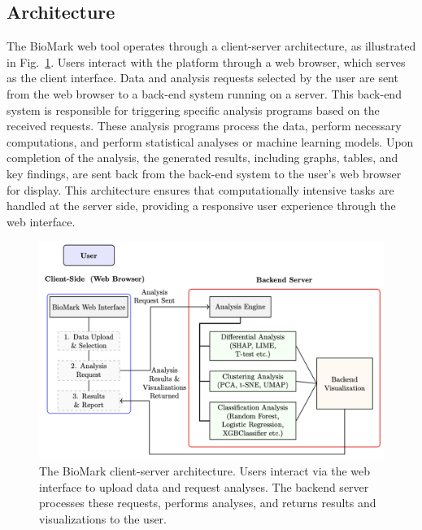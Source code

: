 \documentclass[journal]{IEEEtran}
\begin{document}
\subsection{Architecture}
The BioMark web tool operates through a client-server architecture, as illustrated in Fig.~\ref{fig:architecture}. Users interact with the platform through a web browser, which serves as the client interface. Data and analysis requests selected by the user are sent from the web browser to a back-end system running on a server. This back-end system is responsible for triggering specific analysis programs based on the received requests. These analysis programs process the data, perform necessary computations, and perform statistical analyses or machine learning models. Upon completion of the analysis, the generated results, including graphs, tables, and key findings, are sent back from the back-end system to the user's web browser for display. This architecture ensures that computationally intensive tasks are handled at the server side, providing a responsive user experience through the web interface.

\begin{figure}[htbp]
\centering
\includegraphics[width=\columnwidth]{architecture_diagram.png}
\caption{The BioMark client-server architecture. Users interact via the web interface to upload data and request analyses. The backend server processes these requests, performs analyses, and returns results and visualizations to the user.}
\label{fig:architecture}
\end{figure}
\end{document}
